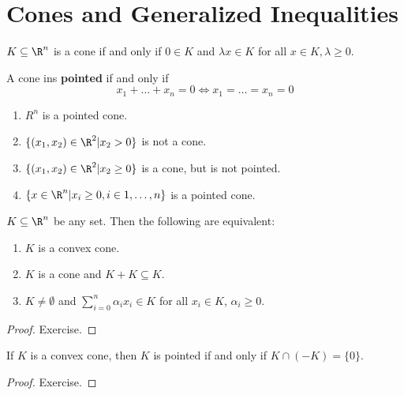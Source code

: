\chapter{Cones and Generalized Inequalities}
\label{cha:cones-gener-ineq}

\begin{defn}
  \label{defn:cones_and_generalized_inequalities:1}
  $K \subseteq \R^{n}$ is a cone if and only if $0 \in K$ and $\lambda x
  \in K$ for all $x \in K, \lambda \geq 0$.
\end{defn}

\begin{defn}
  \label{defn:cones_and_generalized_inequalities:1}
  A cone ins \textbf{pointed} if and only if
  \begin{equation}
    \label{eq:27}
     x_{1} + \dots + x_{n} = 0 \iff x_{1} = \dots = x_{n} = 0
  \end{equation}
\end{defn}

\begin{exmp}
  \label{defn:cones_and_generalized_inequalities:1}
  \begin{enumerate}
  \item $R^{n}$ is a pointed cone.
  \item $\{ (x_{1}, x_{2}) \in \R^{2} | x_{2} > 0 \}$ is not a cone.
  \item $\{ (x_{1}, x_{2}) \in \R^{2} | x_{2} \geq 0 \}$ is a cone,
    but is not pointed.
  \item $\{ x \in \R^{n} | x_{i} \geq 0, i \in 1, \dots, n \}$ is a
    pointed cone.
  \end{enumerate}
\end{exmp}

\begin{proposition}
  $K \subseteq \R^{n}$ be any set.  Then the following are equivalent:
  \begin{enumerate}
  \item $K$ is a convex cone.
  \item $K$ is a cone and $K + K \subseteq K$.
  \item $K \neq \emptyset$ and $\sum_{i=0}^{n} \alpha_{i} x_{i} \in K$
    for all $x_{i} \in K$, $\alpha_{i} \geq 0$.
  \end{enumerate}
\end{proposition}

\begin{proof}
  Exercise.
\end{proof}

\begin{proposition}
  If $K$ is a convex cone, then $K$ is pointed if and only if $K \cap
  (-K) = \{ 0 \}$.
\end{proposition}

\begin{proof}
  Exercise.
\end{proof}

